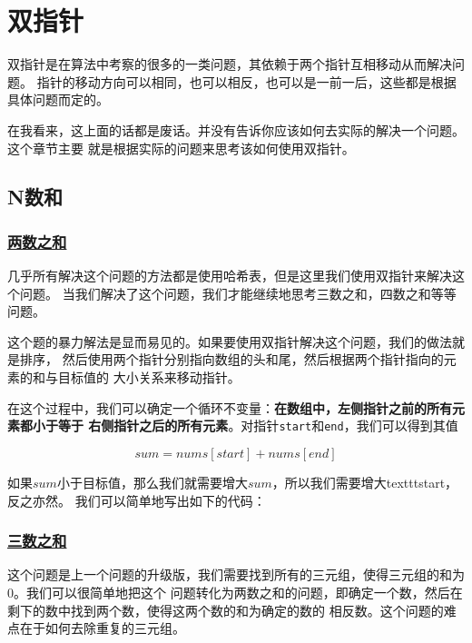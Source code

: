 \documentclass[../../main.tex]{subfiles}
\begin{document}
\setchapterpreamble[u]{\margintoc}

\chapter{双指针}

双指针是在算法中考察的很多的一类问题，其依赖于两个指针互相移动从而解决问题。
指针的移动方向可以相同，也可以相反，也可以是一前一后，这些都是根据具体问题而定的。

在我看来，这上面的话都是废话。并没有告诉你应该如何去实际的解决一个问题。这个章节主要
就是根据实际的问题来思考该如何使用双指针。

\section{N数和}

\subsection{\href{https://leetcode-cn.com/problems/two-sum/}{两数之和}}

几乎所有解决这个问题的方法都是使用哈希表，但是这里我们使用双指针来解决这个问题。
当我们解决了这个问题，我们才能继续地思考三数之和，四数之和等等问题。

这个题的暴力解法是显而易见的。如果要使用双指针解决这个问题，我们的做法就是排序，
然后使用两个指针分别指向数组的头和尾，然后根据两个指针指向的元素的和与目标值的
大小关系来移动指针。

在这个过程中，我们可以确定一个循环不变量：\textbf{在数组中，左侧指针之前的所有元素都小于等于
右侧指针之后的所有元素}。对指针\texttt{start}和\texttt{end}，我们可以得到其值

$$
sum = nums[start] + nums[end]
$$

如果$sum$小于目标值，那么我们就需要增大$sum$，所以我们需要增大texttt{start}，反之亦然。
我们可以简单地写出如下的代码：



\subsection{\href{https://leetcode-cn.com/problems/3sum}{三数之和}}

这个问题是上一个问题的升级版，我们需要找到所有的三元组，使得三元组的和为0。我们可以很简单地把这个
问题转化为两数之和的问题，即确定一个数，然后在剩下的数中找到两个数，使得这两个数的和为确定的数的
相反数。这个问题的难点在于如何去除重复的三元组。
\end{document}
